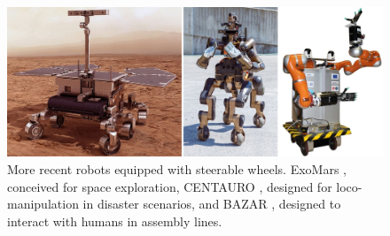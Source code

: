 \begin{figure}
    \centering
    \includegraphics[width=\textwidth]{figures/01-introduction/SWMRs-2.jpg}
    \caption{More recent robots equipped with steerable wheels.
        ExoMars \cite{Poulakis2015ExoMarsMobilitySubsystem}, conceived for 
        space exploration,
        CENTAURO \cite{Kashiri2019Centauro}, designed for loco-manipulation
        in disaster scenarios, and
        BAZAR \cite{Cherubini2019ACR}, designed to interact with humans in
        assembly lines.
    }
    \label{fig:introduction:SWMRs-2}
\end{figure}
